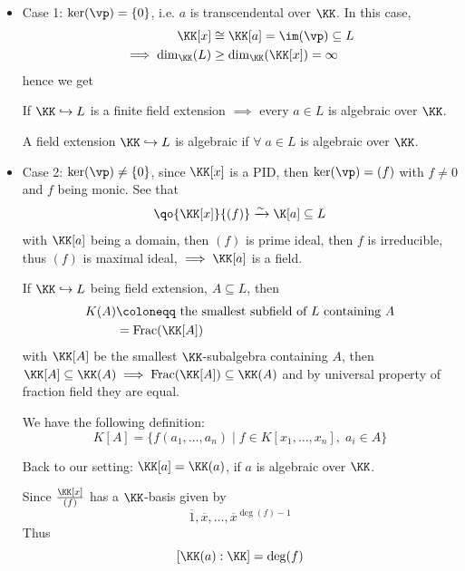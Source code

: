 \begin{itemize}
	\item Case 1: \( \ker(\vp) = \{0\} \), i.e. \( a \) is transcendental over \( \KK \). In this
	      case,
	      \[
		      \begin{aligned}
			      \KK[x]               & \cong \KK[a] = \im(\vp) \subseteq L \\
			      \implies \dim_\KK(L) & \geq \dim_\KK(\KK[x]) = \infty
		      \end{aligned}
	      \]
	      hence we get
	      \begin{proposition}
		      If \( \KK \hookrightarrow L \) is a finite field extension \( \implies \) every \( a\in L \) is
		      algebraic over \( \KK \).
	      \end{proposition}
	      \begin{definition}
		      A field extension \( \KK \hookrightarrow L \) is algebraic if \( \forall \; a \in L \) is
		      algebraic over \( \KK \).
	      \end{definition}
	\item Case 2: \( \ker(\vp) \ne \{0\} \), since \( \KK[x] \) is a PID, then \( \ker(\vp) = (f) \)
	      with \( f \ne 0 \) and \( f \) being monic. See that
	      \[
		      \qo{\KK[x]}{(f)} \xrightarrow{\sim} \K[a] \subseteq L
	      \]
	      with \( \KK[a] \) being a domain, then \( (f) \) is prime ideal, then \( f \) is
	      irreducible, thus \( (f) \) is maximal ideal, \(\implies \KK[a] \) is a field.
	      \begin{notation}
		      If \( \KK\hookrightarrow L \) being field extension, \( A \subseteq L \), then
		      \[
			      \begin{aligned}
				      K(A) & \coloneqq \text{ the smallest subfield of } L \text{ containing } A \\
				           & = \text{Frac}(\KK[A])
			      \end{aligned}
		      \]
		      with \( \KK[A] \) be the smallest \( \KK \)-subalgebra containing \( A \), then \( \KK[A] \subseteq
		      \KK(A) \implies \text{Frac}(\KK[A]) \subseteq \KK(A) \) and by universal property of fraction
		      field they are equal.
		      \begin{note}
			      We have the following definition:
			      \[
				      K[A] = \{f(a_1,\ldots, a_n) \; | \; f\in K[x_1,\ldots, x_n], \; a_i \in A\}
			      \]
		      \end{note}
	      \end{notation}
	      Back to our setting: \( \KK[a] = \KK(a) \), if \( a \) is algebraic over \( \KK \).
	      \begin{remark}
		      Since \( \frac{\KK[x]}{(f)}\) has a \( \KK \)-basis given by
		      \[
			      \overline{1},\overline{x},\ldots,\overline{x}^{\deg(f)-1}
		      \]
		      Thus
		      \[
			      [\KK(a): \KK] = \deg(f)
		      \]
	      \end{remark}
\end{itemize}


